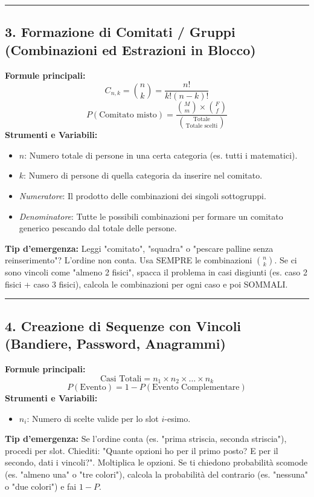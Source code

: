 \documentclass[12pt, a4paper]{article}
\begin{document}
\vspace{0.3cm}\hrule\vspace{0.3cm}

\subsection*{3. Formazione di Comitati / Gruppi (Combinazioni ed Estrazioni in Blocco)}
\textbf{Formule principali:}
$$ C_{n,k} = \binom{n}{k} = \frac{n!}{k!(n-k)!} $$
$$ P(\text{Comitato misto}) = \frac{\binom{M}{m} \times \binom{F}{f}}{\binom{\text{Totale}}{\text{Totale scelti}}} $$
\textbf{Strumenti e Variabili:}
\begin{itemize}
    \item $n$: Numero totale di persone in una certa categoria (es. tutti i matematici).
    \item $k$: Numero di persone di quella categoria da inserire nel comitato.
    \item \textit{Numeratore}: Il prodotto delle combinazioni dei singoli sottogruppi.
    \item \textit{Denominatore}: Tutte le possibili combinazioni per formare un comitato generico pescando dal totale delle persone.
\end{itemize}
\textbf{Tip d'emergenza:} Leggi "comitato", "squadra" o "pescare palline senza reinserimento"? L'ordine non conta. Usa SEMPRE le combinazioni $\binom{n}{k}$. Se ci sono vincoli come "almeno 2 fisici", spacca il problema in casi disgiunti (es. caso 2 fisici + caso 3 fisici), calcola le combinazioni per ogni caso e poi SOMMALI.

\vspace{0.3cm}\hrule\vspace{0.3cm}

\subsection*{4. Creazione di Sequenze con Vincoli (Bandiere, Password, Anagrammi)}
\textbf{Formule principali:}
$$ \text{Casi Totali} = n_1 \times n_2 \times \dots \times n_k $$
$$ P(\text{Evento}) = 1 - P(\text{Evento Complementare}) $$
\textbf{Strumenti e Variabili:}
\begin{itemize}
    \item $n_i$: Numero di scelte valide per lo slot $i$-esimo.
\end{itemize}
\textbf{Tip d'emergenza:} Se l'ordine conta (es. "prima striscia, seconda striscia"), procedi per slot. Chiediti: "Quante opzioni ho per il primo posto? E per il secondo, dati i vincoli?". Moltiplica le opzioni. Se ti chiedono probabilità scomode (es. "almeno una" o "tre colori"), calcola la probabilità del contrario (es. "nessuna" o "due colori") e fai $1 - P$.
\end{document}
